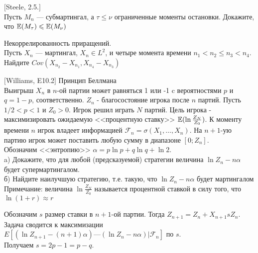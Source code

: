 \begin{problem}
$[$Steele, 2.5.$]$ \\
Пусть $M_{n}$ — субмартингал, а $\tau\le\nu$ ограниченные моменты
остановки. Докажите, что $\mathbb{E}(M_{\tau})\leqslant \mathbb{E}(M_{\nu})$

\begin{sol}

\end{sol}
\end{problem}

\begin{problem}
Некоррелированность приращений. \\
Пусть $X_{n}$ — мартингал, $X_{n}\in L^{2}$, и четыре момента
времени $n_{1}<n_{2}\le n_{3}<n_{4}$. \\
Найдите $Cov(X_{n_{2}}-X_{n_{1}},X_{n_{4}}-X_{n_{3}})$

\begin{sol}

\end{sol}
\end{problem}

\begin{problem}
$[$Williams, E10.2$]$ Принцип Беллмана \\
Выигрыш $X_{n}$ в $n$-ой партии может равняться 1 или -1 c
вероятностями $p$ и $q=1-p$, соответственно. $Z_{n}$ -
благосостояние игрока после $n$ партий. Пусть $1/2<p<1$ и
$Z_{0}>0$. Игрок решил играть $N$ партий. Цель игрока -
максимизировать ожидаемую <<процентную ставку>>
$\mathbb{E}(\ln\frac{Z_{N}}{Z_{0}})$. К моменту времени $n$ игрок владеет
информацией $\mathcal{F}_{n}=\sigma(X_{1},\ldots,X_{n})$. На $n+1$-ую
партию игрок может поставить любую сумму в диапазоне $[0;Z_{n}]$.
\\
Обозначим <<энтропию>> $\alpha=p\ln p+q\ln q+\ln 2$. \\
a) Докажите, что для любой (предсказуемой) стратегии величина $\ln
Z_{n}-n\alpha$ будет супермартингалом. \\
б) Найдите наилучшую стратегию, т.е. такую, что $\ln
Z_{n}-n\alpha$ будет мартингалом \\
Примечание: величина $\ln\frac{Z_{N}}{Z_{0}}$ называется
процентной ставкой в силу того, что $\ln(1+r)\approx r$

\begin{sol}

Обозначим $s$ размер ставки в $n+1$-ой партии. Тогда
$Z_{n+1}=Z_{n}+X_{n+1}sZ_{n}$. \\
Задача сводится к максимизации $E[(\ln Z_{n+1}-(n+1)\alpha) — (\ln
Z_{n}-n\alpha)|\mathcal{F}_{n}]$ по $s$. \\
Получаем $s=2p-1=p-q$.
\end{sol}
\end{problem}

